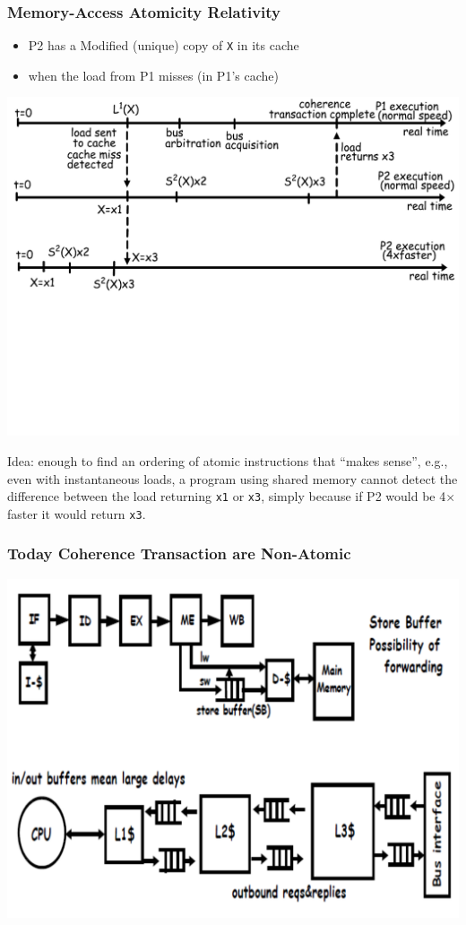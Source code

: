 \documentclass{beamer}
\newcommand{\emp}[1]{\textcolor{DikuRed}{ #1}}
\begin{document}
\begin{frame}[fragile,t]
\frametitle{Memory-Access Atomicity Relativity}

\begin{itemize}
    \item P2 has a Modified (unique) copy of {\tt X} in its cache
    \item when the load from P1 misses (in P1's cache)
\end{itemize}

{\center \includegraphics[width=59ex]{Ch7Figs/CoherenceEG1}}\pause
\vspace{-18ex}

\emp{Idea: enough to find an ordering of atomic instructions that ``makes sense''}, e.g.,
even with instantaneous loads, a program using shared memory 
cannot detect the difference between the load returning {\tt x1} or 
{\tt x3}, simply because if P2 would be 4$\times$ faster it would return {\tt x3}.

\end{frame}


\begin{frame}[fragile,t]
\frametitle{Today Coherence Transaction are Non-Atomic}

{\center \includegraphics[width=59ex]{Ch7Figs/SoteBuffs}}\pause

\end{frame}
\end{document}
